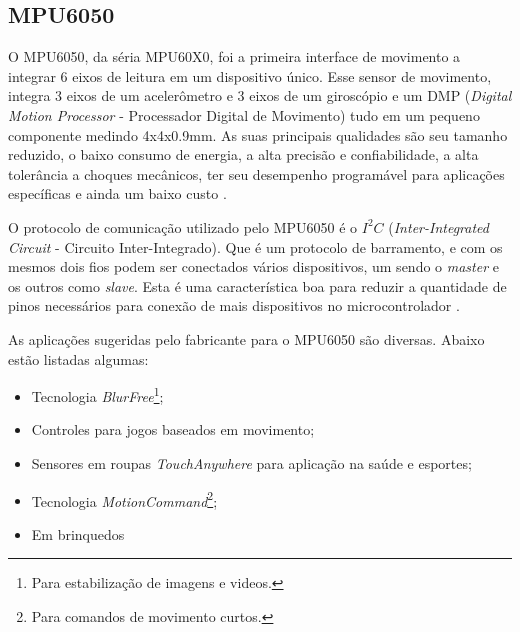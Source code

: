 \subsection{MPU6050}
	
	O MPU6050, da séria MPU60X0, foi a primeira interface de movimento a integrar 6 eixos de leitura em um dispositivo único. Esse sensor de movimento, integra 3 eixos de um acelerômetro e 3 eixos de um giroscópio e um DMP (\textit{Digital Motion Processor} - Processador Digital de Movimento) tudo em um pequeno componente medindo 4x4x0.9mm. As suas principais qualidades são seu tamanho reduzido, o baixo consumo de energia, a alta precisão e confiabilidade, a alta tolerância a choques mecânicos, ter seu desempenho programável para aplicações específicas e ainda um baixo custo \cite{mpu6050}.
	
	O protocolo de comunicação utilizado pelo MPU6050 é o $I^2C$ (\textit{Inter-Integrated Circuit} - Circuito Inter-Integrado). Que é um protocolo de barramento, e com os mesmos dois fios podem ser conectados vários dispositivos, um sendo o \textit{master} e os outros como \textit{slave}. Esta é uma característica boa para reduzir a quantidade de pinos necessários para conexão de mais dispositivos no microcontrolador \cite{mpu6050}.
	
	As aplicações sugeridas pelo fabricante para o MPU6050 são diversas. Abaixo estão listadas algumas:
	\begin{itemize}
		\item Tecnologia \textit{ BlurFree\texttrademark }\footnote{Para estabilização de imagens e videos.};
		\item Controles para jogos baseados em movimento;
		\item Sensores em roupas \textit{TouchAnywhere} para aplicação na saúde e esportes;
		\item Tecnologia \textit{ MotionCommand\texttrademark}\footnote{Para comandos de movimento curtos.}; 
		\item Em brinquedos
	\end{itemize}
	
